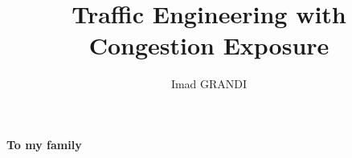 \documentclass[mres]{ucl_thesis}
\title{Traffic Engineering with Congestion Exposure}
\author{Imad GRANDI}
\begin{document}
\maketitle

\clearpage
\clearpage
\fontsize{12}{15}
\selectfont
\begin{center}
\textbf{}
\end{center}
\clearpage
\begin{center}
\textbf{To my family}
\end{center}




\setcounter{tocdepth}{2}
\tableofcontents
\listoffigures

\cleardoublepage


















\end{document}
